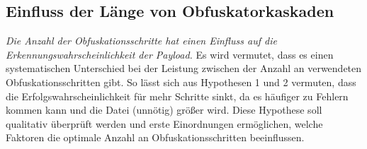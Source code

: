 \subsection{Einfluss der Länge von Obfuskatorkaskaden}
\textit{Die Anzahl der Obfuskationsschritte hat einen Einfluss auf die Erkennungswahrscheinlichkeit der Payload.} Es wird vermutet, dass es einen systematischen Unterschied bei der Leistung zwischen der Anzahl an verwendeten Obfuskationsschritten gibt. So lässt sich aus Hypothesen 1 und 2 vermuten, dass die Erfolgswahrscheinlichkeit für mehr Schritte sinkt, da es häufiger zu Fehlern kommen kann und die Datei (unnötig) größer wird. Diese Hypothese soll qualitativ überprüft werden und erste Einordnungen ermöglichen, welche Faktoren die optimale Anzahl an Obfuskationsschritten beeinflussen.
